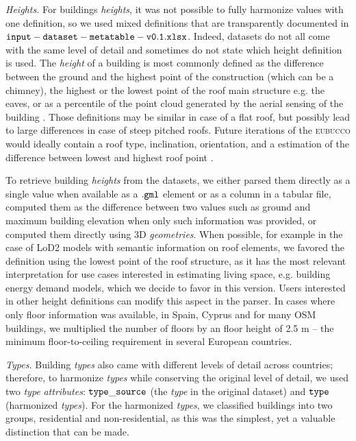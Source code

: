 \documentclass[fleqn,10pt]{wlscirep}
\begin{document}
\medskip \noindent \textit{Heights.} \hspace{0.1cm} For buildings \textit{heights}, it was not possible to fully harmonize values with one definition, so we used mixed definitions that are transparently documented in ${\tt input-dataset-metatable-v0.1.xlsx}$. Indeed, datasets do not all come with the same level of detail and sometimes do not state which height definition is used. The \textit{height} of a building is most commonly defined as the difference between the ground and the highest point of the construction (which can be a chimney), the highest or the lowest point of the roof main structure e.g. the eaves, or as a percentile of the point cloud generated by the aerial sensing of the building \cite{peters2021automated}. Those definitions may be similar in case of a flat roof, but possibly lead to large differences in case of steep pitched roofs. Future iterations of the \textsc{eubucco} would ideally contain a roof type, inclination, orientation, and a estimation of the difference between lowest and highest roof point \cite{zhang2022vectorized}.    

To retrieve building \textit{heights} from the datasets, we either parsed them directly as a single value when available as a $\tt{.gml}$ element or as a column in a tabular file, computed them as the difference between two values such as ground and maximum building elevation when only such information was provided, or computed them directly using 3D \textit{geometries}. When possible, for example in the case of LoD2 models with semantic information on roof elements, we favored the definition using the lowest point of the roof structure, as it has the most relevant interpretation for use cases interested in estimating living space, e.g. building energy demand models, which we decide to favor in this version. Users interested in other height definitions can modify this aspect in the parser. In cases where only floor information was available, in Spain, Cyprus and for many OSM buildings, we multiplied the number of floors by an floor height of 2.5 m -- the minimum floor-to-ceiling requirement in several European countries\cite{milojevic2020learning}. 

\medskip \noindent \textit{Types.} \hspace{0.1cm} Building \textit{types} also came with different levels of detail across countries; therefore, to harmonize \textit{types} while conserving the original level of detail, we used two \textit{type} \textit{attributes}: $\tt{type\_source}$ (the \textit{type} in the original dataset) and $\tt{type}$ (harmonized \textit{types}). For the harmonized \textit{types}, we classified buildings into two groups, residential and non-residential, as this was the simplest, yet a valuable distinction that can be made. 
\end{document}
